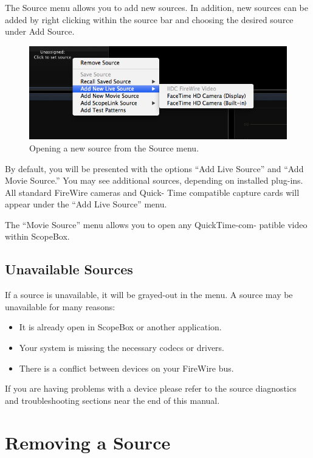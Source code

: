 \documentclass[10,letterpaper,]{report}
\begin{document}
The Source menu allows you to add new sources. In addition, new sources
can be added by right clicking within the source bar and choosing the
desired source under Add Source.

\begin{figure}[htbp]
\centering
\includegraphics{images/AddingSource.png}
\caption{Opening a new source from the Source menu.}
\end{figure}

By default, you will be presented with the options ``Add Live Source''
and ``Add Movie Source.'' You may see additional sources, depending on
installed plug-ins. All standard FireWire cameras and Quick- Time
compatible capture cards will appear under the ``Add Live Source'' menu.

The ``Movie Source'' menu allows you to open any QuickTime-com- patible
video within ScopeBox.

\subsection{Unavailable Sources}

If a source is unavailable, it will be grayed-out in the menu. A source
may be unavailable for many reasons:

\begin{itemize}
\itemsep1pt\parskip0pt
\item
  It is already open in ScopeBox or another application.
\item
  Your system is missing the necessary codecs or drivers.
\item
  There is a conflict between devices on your FireWire bus.
\end{itemize}

If you are having problems with a device please refer to the source
diagnostics and troubleshooting sections near the end of this manual.

\section{Removing a Source}
\end{document}
